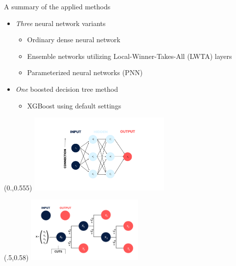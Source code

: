 \documentclass[UKenglish]{beamer}
\begin{document}
\begin{frame}{A summary of the applied methods}
    \begin{itemize}

    \item \emph{Three} neural network variants
    \begin{itemize}
        \item Ordinary dense neural network
        \item Ensemble networks utilizing Local-Winner-Takes-All (LWTA) layers
        \item Parameterized neural networks (PNN)
    \end{itemize}

    \item \emph{One} boosted decision tree method
    \begin{itemize}
        \item XGBoost using default settings
    \end{itemize}

    \end{itemize}
    
    \begin{textblock}{1}(0.,0.555)
        \includegraphics[width=0.525\textwidth]{figures/Input_labels.png}
    \end{textblock}
    \begin{textblock}{1}(.5,0.58)
        \includegraphics[width=0.435\textwidth]{figures/DT.png}
    \end{textblock}
\end{frame}
\end{document}
